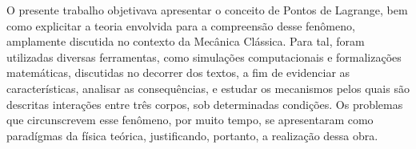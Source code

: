    O presente trabalho objetivava apresentar o conceito de Pontos de Lagrange, bem como explicitar a teoria envolvida para a compreensão desse fenômeno, amplamente discutida no contexto da Mecânica Clássica. Para tal, foram utilizadas diversas ferramentas, como simulações computacionais e formalizações matemáticas, discutidas no decorrer dos textos, a fim de evidenciar as características, analisar as consequências, e estudar os mecanismos pelos quais são descritas interações entre três corpos, sob determinadas condições. Os problemas que circunscrevem esse fenômeno, por muito tempo, se apresentaram como  paradígmas da física teórica, justificando, portanto, a realização dessa obra.
